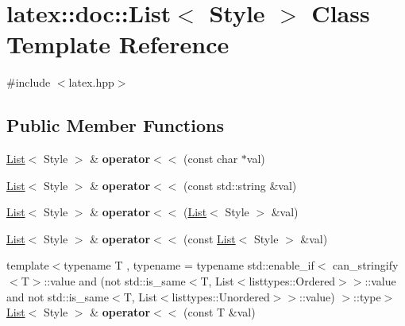 \hypertarget{classlatex_1_1doc_1_1List}{\section{latex\-:\-:doc\-:\-:List$<$ Style $>$ Class Template Reference}
\label{classlatex_1_1doc_1_1List}
}


{\ttfamily \#include $<$latex.\-hpp$>$}

\subsection*{Public Member Functions}
\begin{DoxyCompactItemize}
\item 
\hypertarget{classlatex_1_1doc_1_1List_afd9fcb1586fd4103801d68345dc3d961}{\hyperlink{classlatex_1_1doc_1_1List}{List}$<$ Style $>$ \& {\bfseries operator$<$$<$} (const char $\ast$val)}\label{classlatex_1_1doc_1_1List_afd9fcb1586fd4103801d68345dc3d961}

\item 
\hypertarget{classlatex_1_1doc_1_1List_a403fcb27a8d89d845ca609caf2d130ac}{\hyperlink{classlatex_1_1doc_1_1List}{List}$<$ Style $>$ \& {\bfseries operator$<$$<$} (const std\-::string \&val)}\label{classlatex_1_1doc_1_1List_a403fcb27a8d89d845ca609caf2d130ac}

\item 
\hypertarget{classlatex_1_1doc_1_1List_ad269a03ad06439356e17c86582b03297}{\hyperlink{classlatex_1_1doc_1_1List}{List}$<$ Style $>$ \& {\bfseries operator$<$$<$} (\hyperlink{classlatex_1_1doc_1_1List}{List}$<$ Style $>$ \&val)}\label{classlatex_1_1doc_1_1List_ad269a03ad06439356e17c86582b03297}

\item 
\hypertarget{classlatex_1_1doc_1_1List_af2f4cbc14d4001b7e185392d8cddf9e8}{\hyperlink{classlatex_1_1doc_1_1List}{List}$<$ Style $>$ \& {\bfseries operator$<$$<$} (const \hyperlink{classlatex_1_1doc_1_1List}{List}$<$ Style $>$ \&val)}\label{classlatex_1_1doc_1_1List_af2f4cbc14d4001b7e185392d8cddf9e8}

\item 
\hypertarget{classlatex_1_1doc_1_1List_a9a5ed93557cd28c325cec55fcf74c76c}{{\footnotesize template$<$typename T , typename  = typename std\-::enable\-\_\-if$<$                can\-\_\-stringify$<$\-T$>$\-::value                and                (not std\-::is\-\_\-same$<$\-T, List$<$listtypes\-::\-Ordered$>$$>$\-::value and not std\-::is\-\_\-same$<$\-T, List$<$listtypes\-::\-Unordered$>$$>$\-::value)            $>$\-::type$>$ }\\\hyperlink{classlatex_1_1doc_1_1List}{List}$<$ Style $>$ \& {\bfseries operator$<$$<$} (const T \&val)}\label{classlatex_1_1doc_1_1List_a9a5ed93557cd28c325cec55fcf74c76c}


\end{DoxyCompactItemize}
